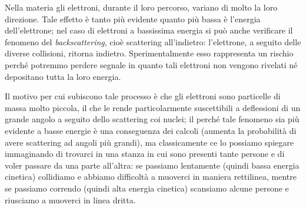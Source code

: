 \begin{minipage}{0.245\textwidth}
\end{minipage}
\begin{minipage}{0.75\textwidth}
    Nella materia gli elettroni, durante il loro percorso, variano di molto la loro direzione. Tale effetto è tanto più evidente quanto più bassa è l'energia dell'elettrone; nel caso di elettroni a bassissima energia si può anche verificare il fenomeno del \textit{backscattering}, cioè scattering all'indietro: l'elettrone, a seguito delle diverse collisioni, ritorna indietro. Sperimentalmente esso rappresenta un rischio perché potremmo perdere segnale in quanto tali elettroni non vengono rivelati né depositano tutta la loro energia.
\end{minipage}

\vspace{0.4cm}Il motivo per cui subiscono tale processo è che gli elettroni sono particelle di massa molto piccola, il che le rende particolarmente suscettibili a deflessioni di un grande angolo a seguito dello scattering coi nuclei; il perché tale fenomeno sia più evidente a basse energie è una conseguenza dei calcoli (aumenta la probabilità di avere scattering ad angoli più grandi), ma classicamente ce lo possiamo spiegare immaginando di trovarci in una stanza in cui sono presenti tante persone e di voler passare da una parte all'altra: se passiamo lentamente (quindi bassa energia cinetica) collidiamo e abbiamo difficoltà a muoverci in maniera rettilinea, mentre se passiamo correndo (quindi alta energia cinetica) scansiamo alcune persone e riusciamo a muoverci in linea dritta.

